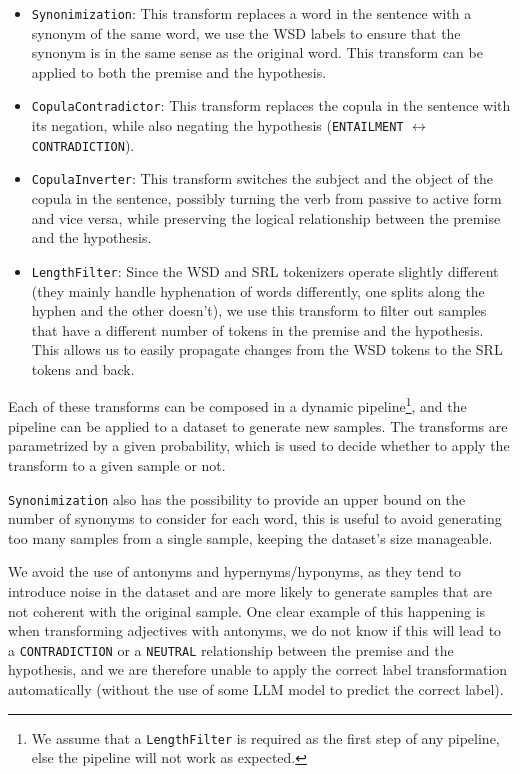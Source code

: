 \documentclass[10pt]{article}
\begin{document}
\begin{itemize}
      \item \texttt{Synonimization}: This transform replaces a word in the sentence with a synonym of the same word, we use the WSD labels to ensure that the synonym is in the same sense as the original word. This transform can be applied to both the premise and the hypothesis.
      \item \texttt{CopulaContradictor}: This transform replaces the copula in the sentence with its negation, while also negating the hypothesis (\texttt{ENTAILMENT} $\leftrightarrow$ \texttt{CONTRADICTION}).
      \item \texttt{CopulaInverter}: This transform switches the subject and the object of the copula in the sentence, possibly turning the verb from passive to active form and vice versa, while preserving the logical relationship between the premise and the hypothesis.
      \item \texttt{LengthFilter}: Since the WSD and SRL tokenizers operate slightly different (they mainly handle hyphenation of words differently, one splits along the hyphen and the other doesn't), we use this transform to filter out samples that have a different number of tokens in the premise and the hypothesis. This allows us to easily propagate changes from the WSD tokens to the SRL tokens and back.
\end{itemize}

Each of these transforms can be composed in a dynamic pipeline\footnote{We assume that a \texttt{LengthFilter} is required as the first step of any pipeline, else the pipeline will not work as expected.}, and the pipeline can be applied to a dataset to generate new samples. The transforms are parametrized by a given probability, which is used to decide whether to apply the transform to a given sample or not.


\texttt{Synonimization} also has the possibility to provide an upper bound on the number of synonyms to consider for each word, this is useful to avoid generating too many samples from a single sample, keeping the dataset's size manageable.

We avoid the use of antonyms and hypernyms/hyponyms, as they tend to introduce noise in the dataset and are more likely to generate samples that are not coherent with the original sample. One clear example of this happening is when transforming adjectives with antonyms, we do not know if this will lead to a \texttt{CONTRADICTION} or a \texttt{NEUTRAL} relationship between the premise and the hypothesis, and we are therefore unable to apply the correct label transformation automatically (without the use of some LLM model to predict the correct label).
\end{document}
